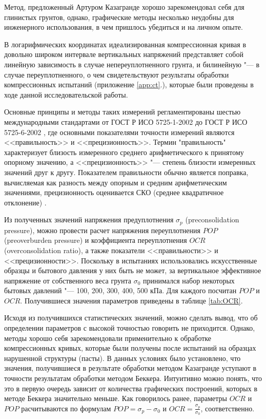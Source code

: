 Метод, предложенный Артуром Казагранде хорошо зарекомендовал себя для глинистых грунтов, однако, графические методы несколько неудобны для инженерного использования, в чем пришлось убедиться и на личном опыте.

В логарифмических координатах идеализированная компрессионная кривая в довольно широком интервале вертикальных напряжений представляет собой линейную зависимость в случае непереуплотненного грунта, и билинейную "--- в случае переуплотненного, о чем свидетельствуют результаты обработки компрессионных испытаний (приложение \ref{app:ct}.), которые были проведены в ходе данной исследовательской работы. 
%
%

Основные принципы и методы таких измерений регламентированы шестью международными стандартами от ГОСТ Р ИСО 5725-1-2002 до ГОСТ Р ИСО 5725-6-2002 \cite{gost5725}, где основными показателями точности измерений являются <<правильность>> и <<прецизионность>>. Термин "правильность" характеризует близость измеренного среднего арифметического к принятому опорному значению, а <<прецизионность>> "--- степень близости измеренных значений друг к другу. Показателем правильности обычно является поправка, вычисляемая как разность между опорным и средним арифметическим значениями, прецизионность оценивается СКО (среднее квадратичное отклонение) \cite{pravandprec}.

Из полученных значений напряжения предуплотнения $\sigma_p$ (preconsolidation pressure), можно провести расчет напряжения переуплотнения $POP$ (preoverburden pressure) и коэффициента переуплотнения $OCR$ (overconsolidation ratio), а также показатели <<правильности>> и <<прецизионности>>. Поскольку в испытаниях использовались искусственные образцы и бытового давления у них быть не может, за вертикальное эффективное напряжение от собственного веса грунта $\sigma_0$ принимался набор некоторых бытовых давлений "--- 100, 200, 300, 400, 500 кПа.
Для каждого посчитан $POP$ и $OCR$. Получившиеся значения параметров приведены в таблице \ref{tab:OCR}.



Исходя из получившихся статистических значений, можно сделать вывод, что об определении параметров с высокой точностью говорить не приходится. Однако, методы хорошо себя зарекомендовали применительно к обработке компрессионных кривых, которые были получены после испытаний на образцах нарушенной структуры (пасты). В данных условиях было установлено, что значения, получившиеся в результате обработки методом Казагранде уступают в точности результатам обработки методом Беккера. Интуитивно можно понять, что это в первую очередь зависит от количества графических построений, которых в методе Беккера значительно меньше. Как говорилось ранее, параметры $OCR$ и $POP$ расчитываются по формулам $POP = \sigma_p - \sigma_0$ и $OCR = \frac{\sigma_p}{\sigma_0}$, соответственно. 
    

